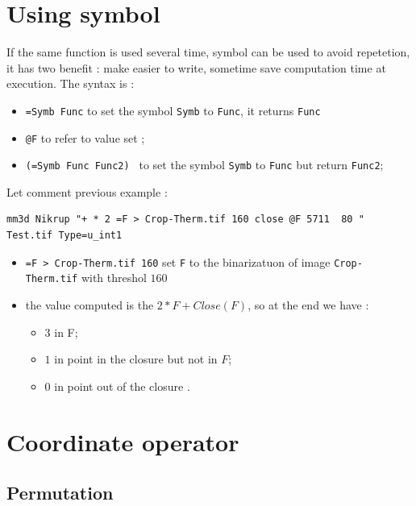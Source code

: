 \section{Using symbol}

If the same function is used several time, symbol can be used to avoid
repetetion, it has two benefit : make easier to write, sometime save
computation time at execution. The syntax is :

\begin{itemize}
   \item  {\tt =Symb Func}  to set the symbol {\tt Symb} to {\tt Func}, 
         it returns {\tt Func}
   \item  {\tt @F} to refer to value set ;
   \item  {\tt (=Symb Func Func2) }  to set the symbol {\tt Symb} to {\tt Func} but return {\tt Func2};
\end{itemize}

Let comment previous example :


\begin{verbatim}
mm3d Nikrup "+ * 2 =F > Crop-Therm.tif 160 close @F 5711  80 " Test.tif Type=u_int1
\end{verbatim}

\begin{itemize}
   \item  {\tt =F > Crop-Therm.tif 160} set {\tt F} to the binarizatuon of image {\tt Crop-Therm.tif}
          with threshol $160$
   \item  the value computed is the $2*F+ Close(F)$, so at the end we have :
   \begin{itemize}
          \item  $3$ in F;
          \item  $1$ in point in the closure but not in $F$;
          \item  $0$ in point out of the closure .
   \end{itemize}
\end{itemize}


\section{Coordinate operator}

\subsection{Permutation}

